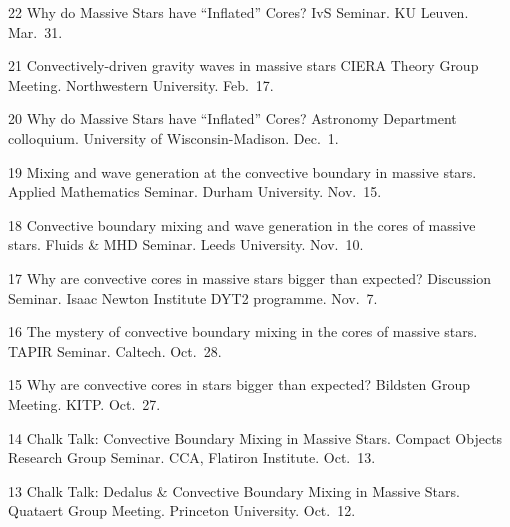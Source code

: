 
      {22}
      { 
        Why do Massive Stars have ``Inflated'' Cores?
      }
      {
        IvS Seminar. KU Leuven. Mar.~31.
      }

\cvpub{}
      {21}
      { 
        Convectively-driven gravity waves in massive stars
      }
      {
        CIERA Theory Group Meeting. Northwestern University. Feb.~17.
      }



      {20}
      { 
        Why do Massive Stars have ``Inflated'' Cores?
      }
      {
        Astronomy Department colloquium. University of Wisconsin-Madison. Dec.~1.
      }

\cvpub{}
      {19}
      {
        Mixing and wave generation at the convective boundary in massive stars.  
      }
      {
        Applied Mathematics Seminar. Durham University. Nov.~15.
      }

\cvpub{}
      {18}
      {
         Convective boundary mixing and wave generation in the cores of massive stars. 
      }
      {
        Fluids \& MHD Seminar. Leeds University. Nov.~10.
      }

\cvpub{}
      {17}
      {
        Why are convective cores in massive stars bigger than expected?  
      }
      {
        Discussion Seminar. Isaac Newton Institute DYT2 programme. Nov.~7.
      }



\cvpub{}
      {16}
      {
        The mystery of convective boundary mixing in the cores of massive stars.
      }
      {
        TAPIR Seminar. Caltech. Oct.~28.
      }

\cvpub{}
      {15}
      {
        Why are convective cores in stars bigger than expected?  
      }
      {
        Bildsten Group Meeting. KITP. Oct.~27.
      }

\cvpub{}
      {14}
      {
        Chalk Talk: Convective Boundary Mixing in Massive Stars.  
      }
      {
        Compact Objects Research Group Seminar. CCA, Flatiron Institute. Oct.~13.
      }

\cvpub{}
      {13}
      {
        Chalk Talk: Dedalus \& Convective Boundary Mixing in Massive Stars.  
      }
      {
        Quataert Group Meeting. Princeton University. Oct.~12.
      }



